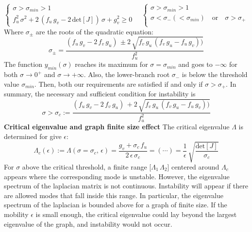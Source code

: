 \begin{equation*}
    \begin{cases}
        \sigma > \sigma_{min} >1  \\
        f_u^2\,\sigma^2 + 2\,(f_u\,g_v-2\,\text{det}[J])\,\sigma + g_v^2 \geq 0 
    \end{cases}
    \quad 
    \begin{cases}
    \sigma > \sigma_{min} >1  \\
    \sigma < \sigma_{-}(<\sigma_{min}) \quad \text{or} \quad  \sigma > \sigma_{+}\\
    \end{cases}
\end{equation*} 
Where $\sigma_{\pm}$ are the roots of the quadratic equation:
\begin{equation*}
    \sigma_{\pm} = \frac{(f_u\,g_v - 2\,f_v\,g_u)\,\pm 2\,\sqrt{f_v\,g_u\,(f_v\,g_u-f_u\,g_v))}}{f_u^2}
\end{equation*}
The function $y_{min}(\sigma)$ reaches its maximum for $\sigma=\sigma_{min}$ and goes to $-\infty$ for both $\sigma\rightarrow0^{+}$ and $\sigma\rightarrow +\infty$. Also, the lower-branch root $\sigma_{-}$ is below the threshold value $\sigma_{min}$. Then, both our requirements are satisfied if and only if $\sigma>\sigma_{+}$. In summary, the necessary and sufficient condition for instability is
\begin{equation*}
 \sigma > \sigma_c :=  \frac{(f_u\,g_v - 2\,f_v\,g_u)\, + 2\,\sqrt{f_v\,g_u\,(f_v\,g_u-f_u\,g_v))}}{f_u^2}
\end{equation*}
\textbf{Critical eigenvalue and graph finite size effect} \newline
The critical eigenvalue $\Lambda$ is determined for give $\epsilon$:
\begin{equation}
\label{eq:critical_eigenvalue}
    \Lambda_c(\epsilon) := \Lambda(\sigma=\sigma_c,\,\epsilon) = \frac{g_v + \sigma_c\,f_u}{2\,\epsilon \,\sigma_c} = (\cdots) = \frac{1}{\epsilon}\,\sqrt{\frac{\text{det}[J]}{\sigma_c}}
\end{equation}
For $\sigma$ above the critical threshold, a finite range [$\Lambda_1\,\Lambda_2$] centered around $\Lambda_c$ appears where the corresponding mode is unstable. However, the eigenvalue spectrum of the laplacian matrix is not continuous. Instability will appear if there are allowed modes that fall inside this range.
In particular, the eigenvalue spectrum of the laplacian is bounded above for a graph of finite size. If the mobility $\epsilon$ is small enough, the critical eigenvalue could lay beyond the largest eigenvalue of the graph, and instability would not occur.
